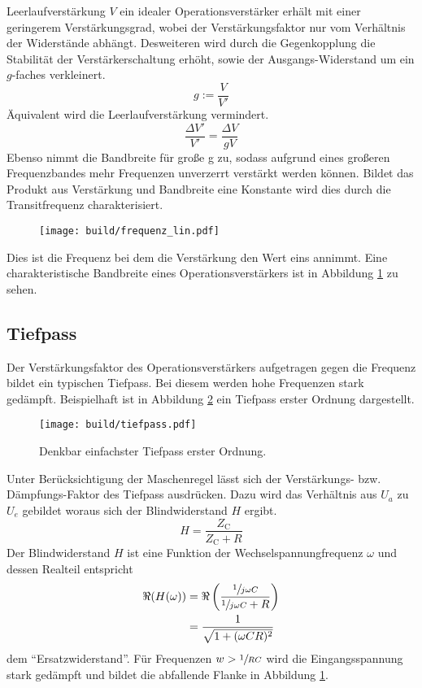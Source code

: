 Leerlaufverstärkung $V$ ein idealer Operationsverstärker erhält mit einer
geringerem Verstärkungsgrad, wobei der Verstärkungsfaktor nur vom Verhältnis
der Widerstände abhängt.
Desweiteren wird durch die Gegenkopplung die Stabilität der
Verstärkerschaltung erhöht, sowie der Ausgangs-Widerstand um ein $g$-faches
verkleinert.
\begin{equation}
		g := \frac{V}{V'}
\end{equation}
Äquivalent wird die Leerlaufverstärkung vermindert.
\begin{equation}
		\frac{\Delta V'}{V'} = \frac{\Delta V}{g V}
\end{equation}
Ebenso nimmt die Bandbreite für große g zu, sodass aufgrund eines großeren
Frequenzbandes mehr Frequenzen unverzerrt verstärkt werden können.
Bildet das Produkt aus Verstärkung und Bandbreite eine Konstante wird dies
durch die Transitfrequenz charakterisiert.
\begin{figure}[h]
		\centering
		\texttt{[image: build/frequenz\_lin.pdf]}
		\caption{\cite{anleitung}}
		\label{fig:freq}
\end{figure}
Dies ist die Frequenz bei dem die Verstärkung den Wert eins annimmt.
Eine charakteristische Bandbreite eines Operationsverstärkers ist in Abbildung
\ref{fig:freq} zu sehen.

\subsection{Tiefpass}%
\label{sub:tiefpass}

Der Verstärkungsfaktor des Operationsverstärkers aufgetragen gegen die Frequenz bildet ein typischen
Tiefpass.
Bei diesem werden hohe Frequenzen stark gedämpft.
Beispielhaft ist in Abbildung \ref{fig:tiefpass} ein Tiefpass erster Ordnung
dargestellt.
\begin{figure}[h]
		\centering
		\texttt{[image: build/tiefpass.pdf]}
		\caption{Denkbar einfachster Tiefpass erster Ordnung. \cite{wiki}}
		\label{fig:tiefpass}
\end{figure}
Unter Berücksichtigung der Maschenregel lässt sich der Verstärkungs- bzw.
Dämpfungs-Faktor des Tiefpass ausdrücken.
Dazu wird das Verhältnis aus $U_a$ zu $U_e$ gebildet woraus sich der
Blindwiderstand $H$ ergibt.
\begin{equation}
		\label{eq:blindwiederstand}
		H = \frac{Z_\text{C}}{Z_\text{C} + R}
\end{equation}
Der Blindwiderstand $H$ ist eine Funktion der Wechselspannungfrequenz $\omega$
und dessen Realteil entspricht
\begin{align}
		\label{eq:h_betrag}
		\Re(H(\omega))  &= \Re \left(\frac{\sfrac{1}{j \omega C}}{\sfrac{1}{j\omega
		C} + R} \right) \\
    &= \frac{1}{\sqrt{1 + (\omega CR)^2}} \label{eq:tiefpass}
\end{align}
dem \enquote{Ersatzwiderstand}.
Für Frequenzen $w > \sfrac{1}{RC}$ wird die Eingangsspannung stark gedämpft und bildet
die abfallende Flanke in Abbildung \ref{fig:freq}.

